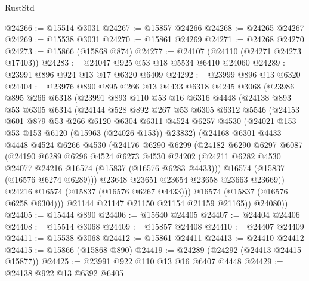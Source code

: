 \begin{lexlean}{RustStd}
\begin{coremodule}
@24266 := @15514 @3031
@24267 := @15857 @24266
@24268 := @24265 @24267
@24269 := @15538 @3031
@24270 := @15861 @24269
@24271 := @24268 @24270
@24273 := @15866 (@15868 @874)
@24277 := @24107 (@24110 (@24271 @24273 @17403))
@24283 := @24047 @925 @53 @18 @5534 @6410 @24060
@24289 := @23991 @896 @924 @13 @17 @6320 @6409
@24292 := @23999 @896 @13 @6320
@24404 := @23976
    @890
    @895
    @266
    @13
    @4433
    @6318
    @4245
    @3068
    (@23986
      @895
      @266
      @6318
      (@23991
        @893
        @110
        @53
        @16
        @6316
        @4448
        (@24138
          @893
          @53
          @6305
          @6314
          (@24144
            @528
            @892
            @267
            @53
            @6305
            @6312
            @5546
            (@24153
              @601
              @879
              @53
              @266
              @6120
              @6304
              @6311
              @4524
              @6257
              @4530
              (@24021 @153 @53 @153 @6120 (@15963 (@24026 @153)) @23832)
              (@24168
                @6301
                @4433
                @4448
                @4524
                @6266
                @4530
                (@24176
                  @6290
                  @6299
                  (@24182
                    @6290
                    @6297
                    @6087
                    (@24190
                      @6289
                      @6296
                      @4524
                      @6273
                      @4530
                      @24202
                      (@24211 @6282 @4530 @24077 @24216 @16574 (@15837 (@16576 @6283 @4433)))
                      @16574
                      (@15837 (@16576 @6274 @6289)))
                    @23648
                    @23651
                    @23654
                    @23658
                    @23663
                    @23669))
                @24216
                @16574
                (@15837 (@16576 @6267 @4433)))
              @16574
              (@15837 (@16576 @6258 @6304)))
            @21144
            @21147
            @21150
            @21154
            @21159
            @21165))
        @24080))
@24405 := @15444 @890
@24406 := @15640 @24405
@24407 := @24404 @24406
@24408 := @15514 @3068
@24409 := @15857 @24408
@24410 := @24407 @24409
@24411 := @15538 @3068
@24412 := @15861 @24411
@24413 := @24410 @24412
@24415 := @15866 (@15868 @890)
@24419 := @24289 (@24292 (@24413 @24415 @15877))
@24425 := @23991 @922 @110 @13 @16 @6407 @4448
@24429 := @24138 @922 @13 @6392 @6405

\end{coremodule}
\end{lexlean}
